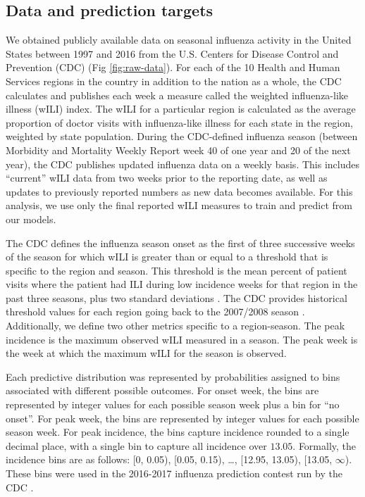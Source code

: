 \documentclass[10pt,letterpaper]{article}
\begin{document}
\subsection{Data and prediction
targets}\label{data-and-prediction-targets}

We obtained publicly available data on seasonal influenza activity in
the United States between 1997 and 2016 from the U.S. Centers for
Disease Control and Prevention (CDC) (Fig \ref{fig:raw-data}). For each
of the 10 Health and Human Services regions in the country in addition
to the nation as a whole, the CDC calculates and publishes each week a
measure called the weighted influenza-like illness (wILI) index. The
wILI for a particular region is calculated as the average proportion of
doctor visits with influenza-like illness for each state in the region,
weighted by state population. During the CDC-defined influenza season
(between Morbidity and Mortality Weekly Report week 40 of one year and
20 of the next year), the CDC publishes updated influenza data on a
weekly basis. This includes ``current'' wILI data from two weeks prior
to the reporting date, as well as updates to previously reported numbers
as new data becomes available. For this analysis, we use only the final
reported wILI measures to train and predict from our models.

The CDC defines the influenza season onset as the first of three
successive weeks of the season for which wILI is greater than or equal
to a threshold that is specific to the region and season. This threshold
is the mean percent of patient visits where the patient had ILI during
low incidence weeks for that region in the past three seasons, plus two
standard deviations \cite{cdc2016}. The CDC provides historical
threshold values for each region going back to the 2007/2008 season
\cite{cdc2016-baselines}. Additionally, we define two other metrics
specific to a region-season. The peak incidence is the maximum observed
wILI measured in a season. The peak week is the week at which the
maximum wILI for the season is observed.

Each predictive distribution was represented by probabilities assigned
to bins associated with different possible outcomes. For onset week, the
bins are represented by integer values for each possible season week
plus a bin for ``no onset''. For peak week, the bins are represented by
integer values for each possible season week. For peak incidence, the
bins capture incidence rounded to a single decimal place, with a single
bin to capture all incidence over \(13.05\). Formally, the incidence
bins are as follows: {[}0, 0.05), {[}0.05, 0.15), \ldots{}, {[}12.95,
13.05), {[}13.05, \(\infty\)). These bins were used in the 2016-2017
influenza prediction contest run by the CDC
\cite{cdc2016-contest-guidelines}.
\end{document}
